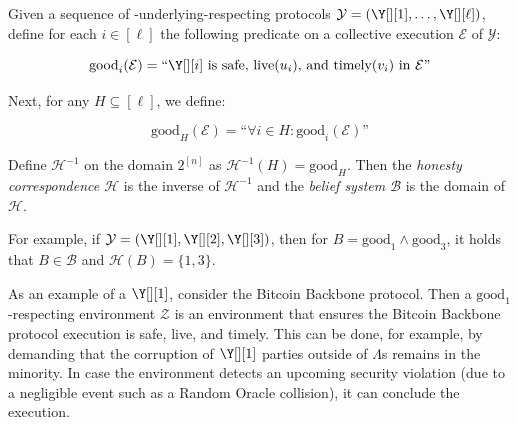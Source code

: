 \begin{definition}
  Given a sequence of \rollerblade-underlying-respecting
  protocols $\mathcal{Y} = (\Y[][1], \ldots, \Y[][\ell])$,
  define for each $i \in [\ell]$ the following predicate on
  a collective execution $\mathcal{E}$ of $\mathcal{Y}$:

  \[
    \text{good}_i(\mathcal{E}) = \text{``} \Y[][i] \text{ is safe, live$(u_i)$, and timely$(v_i)$ in $\mathcal{E}$''}
  \]

  Next, for any $H \subseteq [\ell]$, we define:

  \[
    \text{good}_H(\mathcal{E}) = \text{``}\forall i \in H: \text{good}_i(\mathcal{E})\text{''}
  \]

  Define $\mathcal{H}^{-1}$ on the domain $2^{[n]}$ as
  $\mathcal{H}^{-1}(H) = \text{good}_H$.
  Then the \emph{\rollerblade honesty correspondence $\mathcal{H}$}
  is the inverse of $\mathcal{H}^{-1}$ and the \emph{\rollerblade belief system
  $\mathcal{B}$} is the domain of $\mathcal{H}$.
\end{definition}

For example, if $\mathcal{Y} = (\Y[][1], \Y[][2], \Y[][3])$,
then for $B = \text{good}_1 \land \text{good}_3$, it holds that
$B \in \mathcal{B}$ and $\mathcal{H}(B) = \{1, 3\}$.

As an example of a $\Y[][1]$, consider the Bitcoin Backbone protocol.
Then a $\text{good}_1$-respecting environment $\mathcal{Z}$ is an environment
that ensures the Bitcoin Backbone protocol execution is safe, live, and timely.
This can be done, for example, by demanding that the corruption of $\Y[][1]$
parties outside of $\Lambda$s remains in the minority. In case the environment
detects an upcoming security violation (due to a negligible event such as a
Random Oracle collision), it can conclude the execution.

